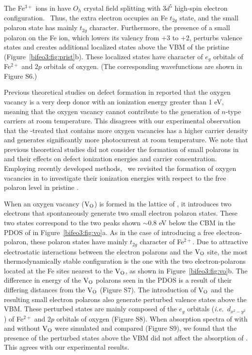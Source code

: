 The Fe$^{3+}$ ions in  have $O_h$ crystal field splitting with $3d^5$ high-spin electron configuration.~\cite{baettig2005first} Thus, the extra electron occupies an Fe $t_{2g}$ state, and the small polaron state has mainly $t_{2g}$ character. Furthermore, the presence of a small polaron on the Fe ion, which lowers its valency from +3 to +2, perturbs valence states and creates additional localized states above the VBM of the pristine  (Figure~\ref{bifeo3:fig:prist}b). These localized states have character of $e_g$ orbitals of Fe$^{2+}$ and $2p$ orbitals of oxygen. (The corresponding wavefunctions are shown in Figure S6.)


Previous theoretical studies on defect formation in  reported that the oxygen vacancy is a very deep donor with an ionization energy greater than 1 eV,~\cite{paudel2012intrinsic,kay2006new,zhang2010density,shimada2016multiferroic} meaning that the oxygen vacancy cannot contribute to the generation of $n$-type carriers at room temperature. This disagrees with our experimental observation that the -treated  that contains more oxygen vacancies has a higher carrier density and generates significantly more photocurrent at room temperature. We note that previous theoretical studies did not consider the formation of small polarons in  and their effects on defect ionization energies and carrier concentration. Employing recently developed methods,~\cite{smart2017effect,seo2018role} we revisited the formation of oxygen vacancies in  to investigate their ionization energies with respect to the free polaron level in pristine .

When an oxygen vacancy ($\rm V_O$) is formed in the lattice of , it introduces two electrons that spontaneously generate two small electron polaron states. These two states correspond to the two peaks shown $\sim$0.8 eV below the CBM in the PDOS of  in Figure~\ref{bifeo3:fig:vo}a. As in the case of introducing a free electron-polaron, these polaron states have mainly $t_{2g}$ character of Fe$^{2+}$. Due to attractive electrostatic interactions between the electron polarons and the $\rm V_O$ site, the most thermodynamically stable configuration is the one with the two electron-polarons located at the Fe sites nearest to the $\rm V_O$, as shown in Figure~\ref{bifeo3:fig:vo}b. The difference in energy of the $\rm V_O$ polarons seen in the PDOS is a result of their differing distances from the $\rm V_O$ (Figure S7). The introduction of $\rm V_O$ and the resulting small electron polarons also generate perturbed valence states above the VBM. These perturbed states are mainly composed of the $e_g$ orbitals (\textit{i.e.}\ $d_{x^2-y^2}$) of Fe$^{2+}$ and $2p$ orbitals of oxygen (Figure S8). When absorption spectra of  with and without $\rm V_O$ were simulated and compared (Figure S9), we found that the presence of the perturbed states above the VBM did not affect the absorption of . This agrees with our experimental results.


